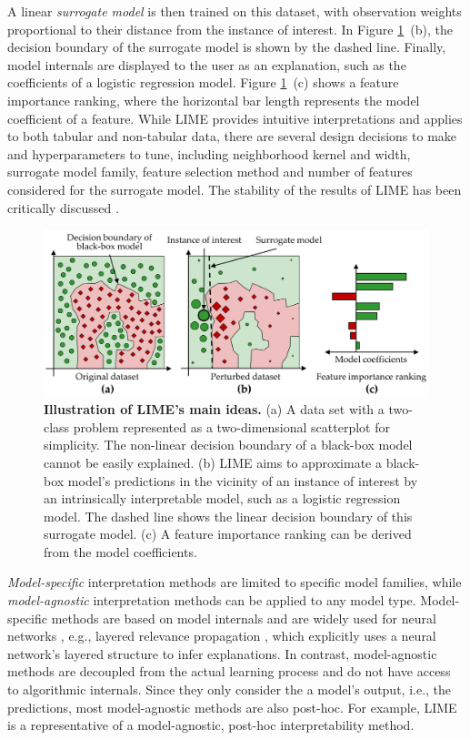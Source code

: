 \documentclass[
  oneside]{book}
\begin{document}
A linear \emph{surrogate model} is then trained on this dataset, with observation weights proportional to their distance from the instance of interest.
In Figure \ref{fig:08-lime}~(b), the decision boundary of the surrogate model is shown by the dashed line.
Finally, model internals are displayed to the user as an explanation, such as the coefficients of a logistic regression model.
Figure \ref{fig:08-lime}~(c) shows a feature importance ranking, where the horizontal bar length represents the model coefficient of a feature.
While LIME provides intuitive interpretations and applies to both tabular and non-tabular data, there are several design decisions to make and hyperparameters to tune, including neighborhood kernel and width, surrogate model family, feature selection method and number of features considered for the surrogate model.
The stability of the results of LIME has been critically discussed \autocite{alvarez2018robustness,visani2020optilime}.



\begin{figure}[htb]

{\centering \includegraphics[width=1\linewidth]{figures/08-lime} 

}

\caption{\textbf{Illustration of LIME's main ideas.} (a) A data set with a two-class problem represented as a two-dimensional scatterplot for simplicity. The non-linear decision boundary of a black-box model cannot be easily explained. (b) LIME aims to approximate a black-box model's predictions in the vicinity of an instance of interest by an intrinsically interpretable model, such as a logistic regression model. The dashed line shows the linear decision boundary of this surrogate model. (c) A feature importance ranking can be derived from the model coefficients.}\label{fig:08-lime}
\end{figure}

\emph{Model-specific} interpretation methods are limited to specific model families, while \emph{model-agnostic} interpretation methods can be applied to any model type.
Model-specific methods are based on model internals and are widely used for neural networks \autocite{samek2020toward}, e.g., layered relevance propagation \autocite{bach2015pixel}, which explicitly uses a neural network's layered structure to infer explanations.
In contrast, model-agnostic methods are decoupled from the actual learning process and do not have access to algorithmic internals.
Since they only consider the a model's output, i.e., the predictions, most model-agnostic methods are also post-hoc.
For example, LIME is a representative of a model-agnostic, post-hoc interpretability method.
\end{document}
